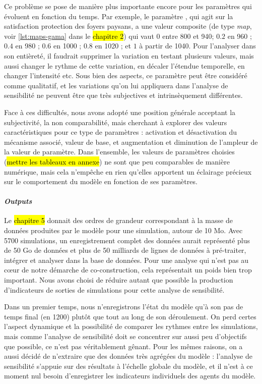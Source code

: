 Ce problème se pose de manière plus importante encore pour les paramètres qui évoluent en fonction du temps.
Par exemple, le paramètre , qui agit sur la satisfaction protection des foyers paysans, a une valeur composite (de type \textit{map}, voir \cref{lst:maps-gama} dans le \hl{chapitre 2}) qui vaut \og $0$ entre 800 et 940; $0.2$ en 960 ; $0.4$ en 980 ; $0.6$ en 1000 ; $0.8$ en 1020 ; et $1$ à partir de 1040\fg{}.
Pour l'analyser dans son entièreté, il faudrait supprimer la variation en testant plusieurs valeurs, mais aussi changer le rythme de cette variation, en décaler l'étendue temporelle, en changer l'intensité etc.
Sous bien des aspects, ce paramètre peut être considéré comme qualitatif, et les variations qu'on lui appliquera dans l'analyse de sensibilité ne peuvent être que très subjectives et intrinsèquement différentes.

Face à ces difficultés, nous avons adopté une position générale acceptant la subjectivité, la non comparabilité, mais cherchant à explorer des valeurs \og caractéristiques\fg{} pour ce type de paramètres : activation et désactivation du mécanisme associé, valeur de base, et augmentation et diminution de l'ampleur de la valeur de paramètre.
Dans l'ensemble, les valeurs de paramètres choisies (\hl{mettre les tableaux en annexe}) ne sont que peu comparables de manière numérique, mais cela n'empêche en rien qu'elles apportent un éclairage précieux sur le comportement du modèle en fonction de ses paramètres.

\paragraph{\textit{Outputs}}

Le \hl{chapitre 5} donnait des ordres de grandeur correspondant à la masse de données produites par le modèle pour une simulation, autour de 10 Mo.
Avec 5700 simulations, un enregistrement complet des données aurait représenté plus de 50 Go de données et plus de 50 milliards de lignes de données à pré-traiter, intégrer et analyser dans la base de données.
Pour une analyse qui n'est pas au cœur de notre démarche de co-construction, cela représentait un poids bien trop important.
Nous avons choisi de réduire autant que possible la production d'indicateurs de sorties de simulations pour cette analyse de sensibilité.

Dans un premier temps, nous n'enregistrons l'état du modèle qu'à son pas de temps final (en 1200) plutôt que tout au long de son déroulement.
On perd certes l'aspect dynamique et la possibilité de comparer les rythmes entre les simulations, mais comme l'analyse de sensibilité doit se concentrer sur aussi peu d'objectifs que possible, ce n'est pas véritablement gênant.
Pour les mêmes raisons, on a aussi décidé de n'extraire que des données très agrégées du modèle : l'analyse de sensibilité s'appuie sur des résultats à l'échelle globale du modèle, et il n'est à ce moment nul besoin d'enregistrer les indicateurs individuels des agents du modèle.

